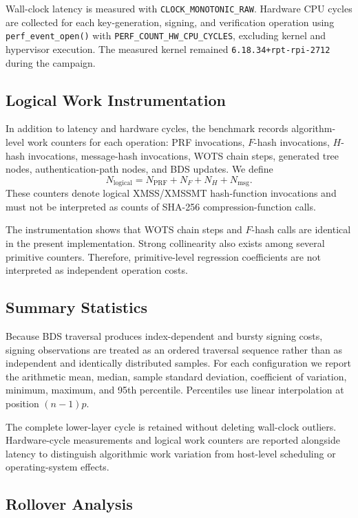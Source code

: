 \documentclass[pdflatex,sn-mathphys-num]{sn-jnl}
\begin{document}
Wall-clock latency is measured with
\texttt{CLOCK\_MONOTONIC\_RAW}. Hardware CPU cycles are collected for
each key-generation, signing, and verification operation using
\texttt{perf\_event\_open()} with
\texttt{PERF\_COUNT\_HW\_CPU\_CYCLES}, excluding kernel and
hypervisor execution. The measured kernel remained
\texttt{6.18.34+rpt-rpi-2712} during the campaign.

\subsection{Logical Work Instrumentation}
\label{sec:logical_work}

In addition to latency and hardware cycles, the benchmark records
algorithm-level work counters for each operation: PRF invocations,
$F$-hash invocations, $H$-hash invocations, message-hash invocations,
WOTS chain steps, generated tree nodes, authentication-path nodes, and
BDS updates. We define
\[
N_{\mathrm{logical}}
 =
N_{\mathrm{PRF}}
+N_F
+N_H
+N_{\mathrm{msg}}.
\]
These counters denote logical XMSS/XMSSMT hash-function invocations and
must not be interpreted as counts of SHA-256 compression-function
calls.

The instrumentation shows that WOTS chain steps and $F$-hash calls are
identical in the present implementation. Strong collinearity also exists
among several primitive counters. Therefore, primitive-level regression
coefficients are not interpreted as independent operation costs.

\subsection{Summary Statistics}
\label{sec:statistics}

Because BDS traversal produces index-dependent and bursty signing
costs, signing observations are treated as an ordered traversal
sequence rather than as independent and identically distributed
samples. For each configuration we report the arithmetic mean, median,
sample standard deviation, coefficient of variation, minimum, maximum,
and 95th percentile. Percentiles use linear interpolation at position
$(n-1)p$.

The complete lower-layer cycle is retained without deleting
wall-clock outliers. Hardware-cycle measurements and logical work
counters are reported alongside latency to distinguish algorithmic
work variation from host-level scheduling or operating-system effects.

\subsection{Rollover Analysis}
\label{sec:rollover_analysis}
\end{document}
